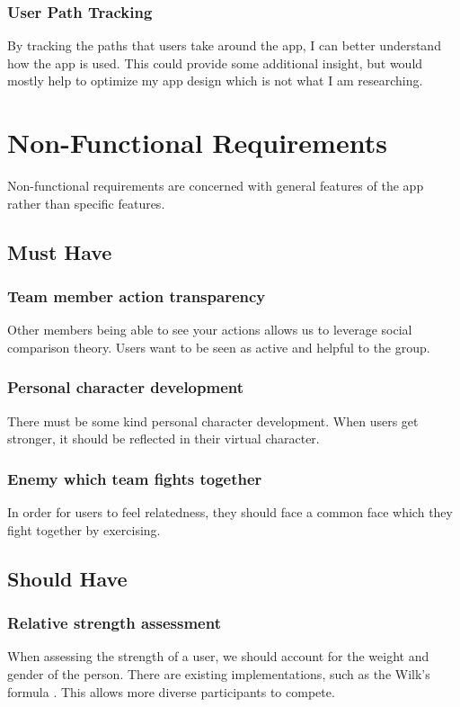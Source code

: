 \documentclass{l4proj}
\begin{document}
  \subsubsection{User Path Tracking}
  By tracking the paths that users take around the app, I can better understand how the app is used. This could provide some additional insight, but would mostly help to optimize my app design which is not what I am researching.


\section{Non-Functional Requirements}
Non-functional requirements are concerned with general features of the app rather than specific features.

\subsection{Must Have}

\subsubsection{Team member action transparency} 
Other members being able to see your actions allows us to leverage social comparison theory. Users want to be seen as active and helpful to the group.

\subsubsection{Personal character development}
There must be some kind personal character development. When users get stronger, it should be reflected in their virtual character.

\subsubsection{Enemy which team fights together}
In order for users to feel relatedness, they should face a common face which they fight together by exercising.

\subsection{Should Have}
  \subsubsection{Relative strength assessment}  
  When assessing the strength of a user, we should account for the weight and gender of the person. There are existing implementations, such as the Wilk's formula \citep{wilks}. This allows more diverse participants to compete.
\end{document}
